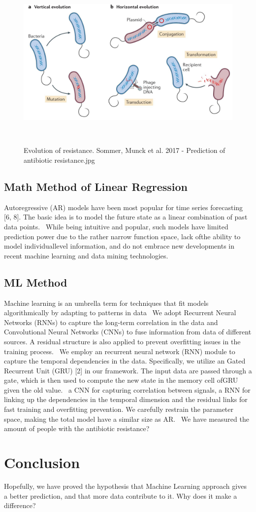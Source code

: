\documentclass[12pt]{article}
\begin{document}
\begin{figure}\includegraphics[width=\textwidth]{Images/f65b4498-79f9-47f3-badf-19f7b1ec7312.jpg}\caption{Evolution of resistance. Sommer, Munck et al. 2017 - Prediction of antibiotic resistance.jpg}
	~\cite[S.~690]{Sommer.2017b}\end{figure}

\subsection{Math Method of Linear Regression}
Autoregressive (AR) models have been most popular for time series forecasting [6, 8]. The basic idea is to model the future state as a linear combination of past data points.~\cite{Cho.03.06.2014b}
While being intuitive and popular, such models have limited prediction power due to the rather narrow function space, lack ofthe ability to model individuallevel information, and do not embrace new developments in recent machine learning and data mining technologies.~\cite{Cho.03.06.2014b}
\subsection{ML Method}
Machine learning is an umbrella term for techniques that fit models algorithmically by adapting to patterns in data~\cite{Mooney.2018}
We adopt Recurrent Neural Networks (RNNs) to capture the long-term correlation in the data and Convolutional Neural Networks (CNNs) to fuse information from data of different sources. A residual structure is also applied to prevent overfitting issues in the training process.~\cite{Cho.03.06.2014b}
We employ an recurrent neural network (RNN) module to capture the temporal dependencies in the data. Specifically, we utilize an Gated Recurrent Unit (GRU) [2] in our framework. The input data are passed through a gate, which is then used to compute the new state in the memory cell ofGRU given the old value.~\cite{Cho.03.06.2014b}
a CNN for capturing correlation between signals, a RNN for linking up the dependencies in the temporal dimension and the residual links for fast training and overfitting prevention. We carefully restrain the parameter space, making the total model have a similar size as AR.~\cite{Cho.03.06.2014b}
We have measured the amount of people with the antibiotic resistance?

\section{Conclusion}
Hopefully, we have proved the hypothesis that Machine Learning approach gives a better prediction, and that more data contribute to it. 
Why does it make a difference?


\end{document}
